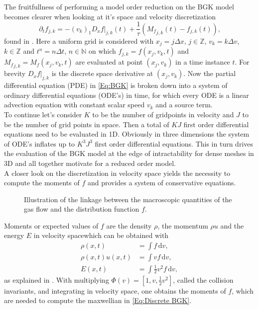 The fruitfullness of performing a model order reduction on the BGK model becomes clearer when looking at it's space and velocity discretization
\begin{equation}
	\partial_t f_{j,k} = -(v_k)_1D_x f|_{j,k}(t) + \frac{1}{\tau}({M_f}_{j,k}(t) - f_{j,k}(t)) \text{,}
	\label{Eq:Discrete BGK}
\end{equation}
found in \cite{puppo2019kinetic}. Here a uniform grid is considered with \(x_j = j\Delta x\), \(j \in \mathbb{Z}\), \(v_k = k\Delta v\), \(k \in \mathbb{Z}\) and \(t^n = n \Delta t\), \(n \in \mathbb{N}\) on which \(f_{j,k} = f(x_j,v_k,t)\) and \({M_f}_{j,k} = M_f(x_j,v_k,t)\) are evaluated at point \((x_j,v_k)\) in a time instance \(t\). For brevity \(D_x f|_{j,k}\) is the discrete space derivative at \((x_j,v_k)\). Now the partial differential equation (PDE) in \cref{Eq:BGK} is broken down into a system of ordinary differential equations (ODE's) in time, for which every ODE is a linear advection equation with constant scalar speed \(v_k\) and a source term.\\
To continue let's consider \(K\) to be the number of gridpoints in velocity and \(J\) to be the number of grid points in space. Then a total of \(KJ\) first order differential equations need to be evaluated in 1D. Obviously in three dimensions the system of ODE's inflates up to \(K^3J^3\) first order differential equations. This in turn drives the evaluation of the BGK model at the edge of intractability for dense meshes in 3D and all together motivate for a reduced order model.\\
A closer look on the discretization in velocity space yields the necessity to compute the moments of \(f\) and provides a system of conservative equations.\\  
\begin{wrapfigure}{r}{0.5\textwidth}
	\vspace{-10pt}
	\scalebox{.9}{}
	\caption{Illustration of the linkage between the macroscopic quantities of the gas flow and the distribution function \(f\).}
	\vspace{-70pt}
	\label{Fig:Demo Macro}
\end{wrapfigure}
Moments or expected values of \(f\) are the density \(\rho\), the momentum \(\rho u\) and the energy \(E\) in velocity spacewhich can be obtained with
	\begin{align} 
	\rho(x,t) &= \int\! f \,\mathrm{d}v  \mathrm{,}\label{Eq:Moments1}\\
	\rho(x,t) u(x,t) &= \int\! v f \,\mathrm{d}v \mathrm{,}\label{Eq:Moments2}\\
	E(x,t) &= \int\! \frac{1}{2}v^2 f  \,\mathrm{d}v \mathrm{,}\label{Eq:Moments3}
	\end{align}
as explained in  \cite{puppo2019kinetic}. With multiplying \(\Phi(v) = [1,v,\frac{1}{2} v^2]\), called the collision invariants, and integrating in velocity space, one obtains the moments of \(f\), which are needed to compute the maxwellian in \cref{Eq:Discrete BGK}.\\

